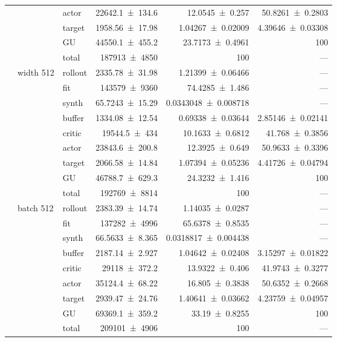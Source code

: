 {\begin{longtable}{@{}lllrrr@{}}
     &  & actor & \num{22642.1+-134.6} & \num{12.0545+-0.257} & \num{50.8261+-0.2803} \\
     &  & target & \num{1958.56+-17.98} & \num{1.04267+-0.02009} & \num{4.39646+-0.03308} \\
     &  & GU & \num{44550.1+-455.2} & \num{23.7173+-0.4961} & 100 \\
     &  & total & \num{187913+-4850} & \num{100} & --- \\
    \addlinespace[2pt]
     & width 512 & rollout & \num{2335.78+-31.98} & \num{1.21399+-0.06466} & --- \\
     &  & fit & \num{143579+-9360} & \num{74.4285+-1.486} & --- \\
     &  & synth & \num{65.7243+-15.29} & \num{0.0343048+-0.008718} & --- \\
     &  & buffer & \num{1334.08+-12.54} & \num{0.69338+-0.03644} & \num{2.85146+-0.02141} \\
     &  & critic & \num{19544.5+-434} & \num{10.1633+-0.6812} & \num{41.768+-0.3856} \\
     &  & actor & \num{23843.6+-200.8} & \num{12.3925+-0.649} & \num{50.9633+-0.3396} \\
     &  & target & \num{2066.58+-14.84} & \num{1.07394+-0.05236} & \num{4.41726+-0.04794} \\
     &  & GU & \num{46788.7+-629.3} & \num{24.3232+-1.416} & 100 \\
     &  & total & \num{192769+-8814} & \num{100} & --- \\
    \addlinespace[2pt]
     & batch 512 & rollout & \num{2383.39+-14.74} & \num{1.14035+-0.0287} & --- \\
     &  & fit & \num{137282+-4996} & \num{65.6378+-0.8535} & --- \\
     &  & synth & \num{66.5633+-8.365} & \num{0.0318817+-0.004438} & --- \\
     &  & buffer & \num{2187.14+-2.927} & \num{1.04642+-0.02408} & \num{3.15297+-0.01822} \\
     &  & critic & \num{29118+-372.2} & \num{13.9322+-0.406} & \num{41.9743+-0.3277} \\
     &  & actor & \num{35124.4+-68.22} & \num{16.805+-0.3838} & \num{50.6352+-0.2668} \\
     &  & target & \num{2939.47+-24.76} & \num{1.40641+-0.03662} & \num{4.23759+-0.04957} \\
     &  & GU & \num{69369.1+-359.2} & \num{33.19+-0.8255} & 100 \\
     &  & total & \num{209101+-4906} & \num{100} & --- \\

\end{longtable}}
